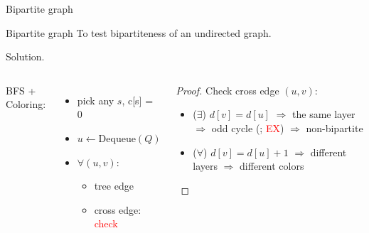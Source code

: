 \begin{frame}{Bipartite graph}
  \begin{exampleblock}{Bipartite graph }
    To test bipartiteness of an undirected graph.
  \end{exampleblock}

  \begin{block}{Solution.}
    \begin{columns}
        BFS + Coloring:
	\begin{itemize}
	  \item pick any $s$, c[s] = 0
	  \item $u \gets \text{Dequeue}(Q)$
	  \item $\forall (u,v)$: 
	    \begin{itemize}
	      \item tree edge
	      \item cross edge: \textcolor{red}{check}
	    \end{itemize}
	\end{itemize}
	\begin{proof}
	  Check cross edge $(u,v)$:
	  \begin{itemize}
	    \item ($\exists$) $d[v] = d[u]$ $\Rightarrow$ the same layer $\Rightarrow$ odd cycle (; \textcolor{red}{EX}) $\Rightarrow$ non-bipartite
	    \item ($\forall$) $d[v] = d[u] + 1$ $\Rightarrow$ different layers $\Rightarrow$ different colors
	  \end{itemize}
	\end{proof}
    \end{columns}
  \end{block}
\end{frame}
